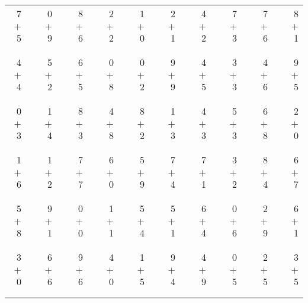 \documentclass[12pt, letterpaper]{article}
\begin{document}
\begin{tabular}{rrrrrrrrrrrrrrrrrrr}
7 & & 0 & & 8 & & 2 & & 1 & & 2 & & 4 & & 7 & & 7 & & 8\\
$+$ 5 & & $+$ 9 & & $+$ 6 & & $+$ 2 & & $+$ 0 & & $+$ 1 & & $+$ 2 & & $+$ 3 & & $+$ 6 & & $+$ 1\\
\cline{1-1} \cline{3-3} \cline{5-5} \cline{7-7} \cline{9-9} \cline{11-11} \cline{13-13} \cline{15-15} \cline{17-17} \cline{19-19} \\ \\
4 & & 5 & & 6 & & 0 & & 0 & & 9 & & 4 & & 3 & & 4 & & 9\\
$+$ 4 & & $+$ 2 & & $+$ 5 & & $+$ 8 & & $+$ 2 & & $+$ 9 & & $+$ 5 & & $+$ 3 & & $+$ 6 & & $+$ 5\\
\cline{1-1} \cline{3-3} \cline{5-5} \cline{7-7} \cline{9-9} \cline{11-11} \cline{13-13} \cline{15-15} \cline{17-17} \cline{19-19} \\ \\
0 & & 1 & & 8 & & 4 & & 8 & & 1 & & 4 & & 5 & & 6 & & 2\\
$+$ 3 & & $+$ 4 & & $+$ 3 & & $+$ 8 & & $+$ 2 & & $+$ 3 & & $+$ 3 & & $+$ 3 & & $+$ 8 & & $+$ 0\\
\cline{1-1} \cline{3-3} \cline{5-5} \cline{7-7} \cline{9-9} \cline{11-11} \cline{13-13} \cline{15-15} \cline{17-17} \cline{19-19} \\ \\
1 & & 1 & & 7 & & 6 & & 5 & & 7 & & 7 & & 3 & & 8 & & 6\\
$+$ 6 & & $+$ 2 & & $+$ 7 & & $+$ 0 & & $+$ 9 & & $+$ 4 & & $+$ 1 & & $+$ 2 & & $+$ 4 & & $+$ 7\\
\cline{1-1} \cline{3-3} \cline{5-5} \cline{7-7} \cline{9-9} \cline{11-11} \cline{13-13} \cline{15-15} \cline{17-17} \cline{19-19} \\ \\
5 & & 9 & & 0 & & 1 & & 5 & & 5 & & 6 & & 0 & & 2 & & 6\\
$+$ 8 & & $+$ 1 & & $+$ 0 & & $+$ 1 & & $+$ 4 & & $+$ 1 & & $+$ 4 & & $+$ 6 & & $+$ 9 & & $+$ 1\\
\cline{1-1} \cline{3-3} \cline{5-5} \cline{7-7} \cline{9-9} \cline{11-11} \cline{13-13} \cline{15-15} \cline{17-17} \cline{19-19} \\ \\
3 & & 6 & & 9 & & 4 & & 1 & & 9 & & 4 & & 0 & & 2 & & 3\\
$+$ 0 & & $+$ 6 & & $+$ 6 & & $+$ 0 & & $+$ 5 & & $+$ 4 & & $+$ 9 & & $+$ 5 & & $+$ 5 & & $+$ 5\\
\cline{1-1} \cline{3-3} \cline{5-5} \cline{7-7} \cline{9-9} \cline{11-11} \cline{13-13} \cline{15-15} \cline{17-17} \cline{19-19} \\ \\

\end{tabular}
\end{document}
